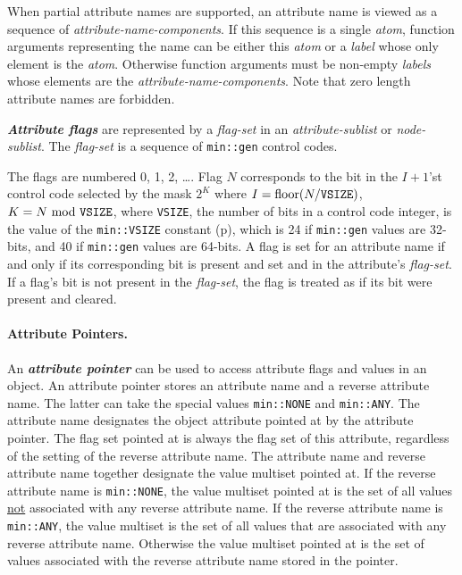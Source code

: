 \documentclass[12pt]{article}
\newcommand{\subsubsubsection}[1]{\paragraph[#1]{#1.}}
\newcommand{\key}[1]{{\bf \em #1}\index{#1}}
\newcommand{\ikey}[2]{{\bf \em #1}\index{#2}}
\newcommand{\pagref}[1]{p\pageref{#1}}
\begin{document}
When partial attribute names are supported, an attribute name is viewed
as a sequence of {\em attribute-name-components}.  If this sequence is
a single {\em atom}, function arguments representing the name can be
either this {\em atom} or a {\em label} whose only element is the {\em atom}.
Otherwise function arguments must be non-empty
{\em labels} whose elements are the {\em attribute-name-components}.
Note that zero length attribute names are forbidden.

\ikey{Attribute flags}{attribute flag!representation}\label{ATTRIBUTE-FLAGS}
are represented by a {\em flag-set} in an {\em attribute-sublist} or
{\em node-sublist}.
The {\em flag-set} is a sequence of \verb|min::gen|
control codes.

The flags are numbered 0, 1, 2, \ldots.  Flag $N$ corresponds to
the bit in the $I+1$'st control code
selected by the mask $2^K$ where $I=\mbox{floor}(N/\mbox{\tt VSIZE})$,
$K=N~\mbox{mod}~\mbox{\tt VSIZE}$, where {\tt VSIZE},
the number of bits in a control code integer,
is the value of the \verb|min::VSIZE| constant (\pagref{MIN::VSIZE}),
which is 24 if \verb|min::gen|
values are 32-bits, and 40 if \verb|min::gen| values are 64-bits.
A flag is set for an attribute name if and only if its corresponding
bit is present and set and in the attribute's {\em flag-set}.
If a flag's bit is not present in the {\em flag-set}, the flag is
treated as if its bit were present and cleared.

\subsubsubsection{Attribute Pointers}
\label{ATTRIBUTE-POINTERS}

An \key{attribute pointer} can be used to access attribute
flags and values
in an object.
An attribute pointer stores an attribute name
and a reverse attribute name.  The latter can take the special
values {\tt min::NONE} and {\tt min::ANY}.  The attribute name designates
the object attribute pointed at by the attribute pointer.
The flag set pointed at is always
the flag set of this attribute, regardless of the setting of the
reverse attribute name.  The attribute name and
reverse attribute name together designate the
value multiset pointed at.  If the reverse attribute name
is {\tt min::NONE}, the value multiset pointed at is the set of all values
\underline{not} associated with any reverse attribute name.  If the
reverse attribute name is {\tt min::ANY},
the value multiset is the set of all
values that are associated with any reverse attribute name.
Otherwise the value multiset pointed at is the set of values
associated with the reverse attribute name stored in the pointer.
\end{document}
